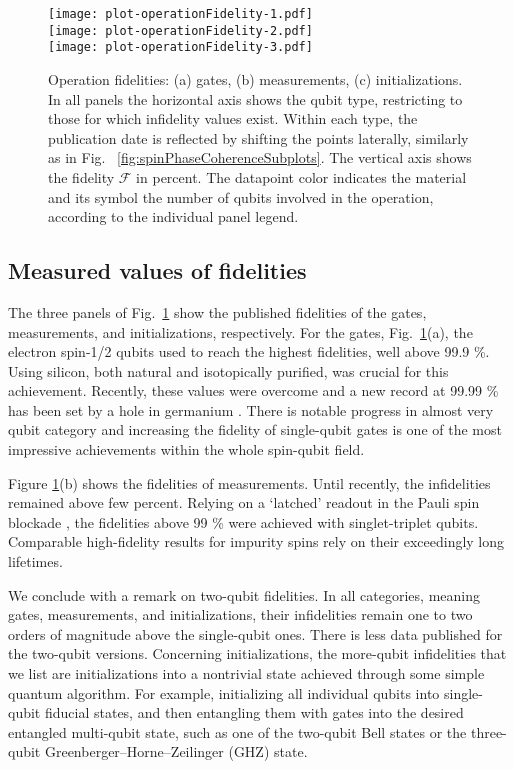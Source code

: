 \documentclass[aps, prx, showpacs, twocolumn, superscriptaddress, notitlepage, longbibliography, floatfix, nofootinbib]{revtex4-2}
\newcommand{\recheck}[1]{{#1}}
\begin{document}
\begin{figure}[ht!]
  \texttt{[image: plot-operationFidelity-1.pdf]} \hfill\\
  \texttt{[image: plot-operationFidelity-2.pdf]} \hfill\\
  \texttt{[image: plot-operationFidelity-3.pdf]} \hfill\\
  \caption{
    \label{fig:operationInfidelities}
  Operation fidelities: (a) gates, (b) measurements, (c) initializations. In all panels the horizontal axis shows the qubit type, restricting to those for which infidelity values exist. Within each type, the publication date is reflected by shifting the points laterally, similarly as in Fig. ~\ref{fig:spinPhaseCoherenceSubplots}. The vertical axis shows the fidelity $\mathcal{F}$ in percent. The datapoint color indicates the material and its symbol the number of qubits involved in the operation, according to the individual panel legend.
  }
\end{figure}

\subsection{Measured values of fidelities}

The three panels of Fig.~\ref{fig:operationInfidelities} show the published fidelities of the gates, measurements, and initializations, respectively. For the gates, Fig.~\ref{fig:operationInfidelities}(a), \recheck{the electron spin-1/2 qubits used to reach the highest fidelities, well above 99.9 \%. Using silicon, both natural and isotopically purified, was crucial for this achievement. Recently, these values were overcome and a new record at 99.99 \% has been set by a hole in germanium \cite{lawrie_simultaneous_2021}.} \recheck{There is notable progress in almost very qubit category} and increasing the fidelity of single-qubit gates is one of the most impressive achievements within the whole spin-qubit field. 

Figure \ref{fig:operationInfidelities}(b) shows the fidelities of measurements. \recheck{Until recently, the infidelities remained above few percent.} \recheck{Relying on a `latched' readout in the Pauli spin blockade \cite{nakajima_robust_2017,broome_high-fidelity_2017}, the fidelities above 99 \% were achieved with singlet-triplet qubits. Comparable high-fidelity results for impurity spins rely on their exceedingly long lifetimes.}

We conclude with a remark on two-qubit fidelities. \recheck{In all categories, meaning gates, measurements, and initializations, their infidelities remain one to two orders of magnitude above the single-qubit ones. There is less data published for the two-qubit versions.} \recheck{Concerning initializations, the more-qubit infidelities that we list are initializations into a nontrivial state achieved through some simple quantum algorithm.} For example, initializing all individual qubits into single-qubit fiducial states, and then entangling them with gates into the desired entangled multi-qubit state, such as one of the two-qubit Bell states or the three-qubit Greenberger–Horne–Zeilinger (GHZ) state. 
\end{document}
